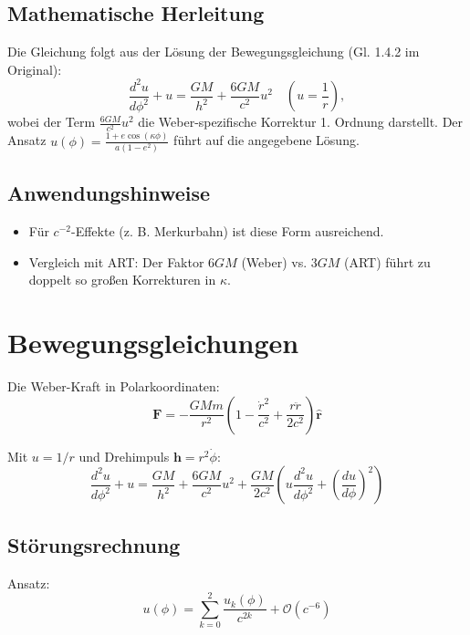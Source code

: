 \subsection*{Mathematische Herleitung}
Die Gleichung folgt aus der Lösung der Bewegungsgleichung (Gl. 1.4.2 im Original):
\[
\frac{d^2u}{d\phi^2} + u = \frac{GM}{h^2} + \frac{6GM}{c^2} u^2 \quad \left(u = \frac{1}{r}\right),
\]
wobei der Term \(\frac{6GM}{c^2} u^2\) die Weber-spezifische Korrektur 1. Ordnung darstellt. Der Ansatz \(u(\phi) = \frac{1 + e \cos(\kappa\phi)}{a(1 - e^2)}\) führt auf die angegebene Lösung.

\subsection*{Anwendungshinweise}
\begin{itemize}
    \item Für \(c^{-2}\)-Effekte (z. B. Merkurbahn) ist diese Form ausreichend.
    \item Vergleich mit ART: Der Faktor \(6GM\) (Weber) vs. \(3GM\) (ART) führt zu doppelt so großen Korrekturen in \(\kappa\).
\end{itemize}

\section{Bewegungsgleichungen}
Die Weber-Kraft in Polarkoordinaten:
\begin{equation}
\mathbf{F} = -\frac{GMm}{r^2}\left(1 - \frac{\dot{r}^2}{c^2} + \frac{r\ddot{r}}{2c^2}\right)\mathbf{\hat{r}}
\end{equation}

Mit $u=1/r$ und Drehimpuls $\mathbf{h}=r^2\dot{\phi}$:
\begin{equation}
\frac{d^2u}{d\phi^2} + u = \frac{GM}{h^2} + \frac{6GM}{c^2}u^2 + \frac{GM}{2c^2}\left(u\frac{d^2u}{d\phi^2} + \left(\frac{du}{d\phi}\right)^2\right)
\end{equation}

\subsection{Störungsrechnung}
Ansatz:
\begin{equation}
u(\phi) = \sum_{k=0}^2 \frac{u_k(\phi)}{c^{2k}} + \mathcal{O}(c^{-6})
\end{equation}

